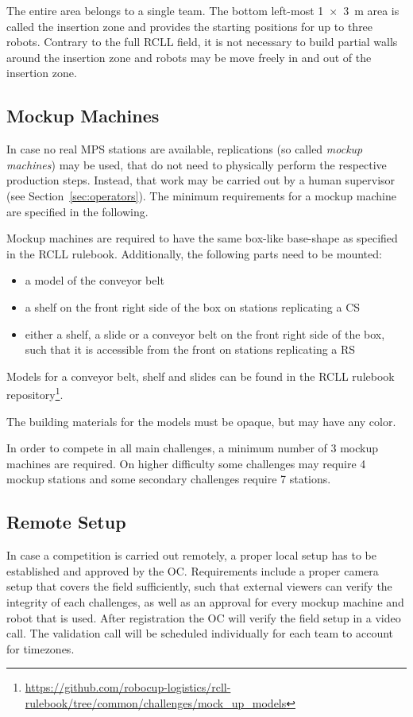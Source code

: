 \documentclass[12pt,twoside]{article}
\newcommand{\refsec}[1]{Section~\ref{#1}}
\begin{document}
The entire area belongs to a single team. The bottom left-most
\SI{1 x 3}{\metre} area is called the insertion zone and provides the starting
positions for up to three robots.
Contrary to the full RCLL field, it is not necessary to build partial walls
around the insertion zone and robots may be move freely in and out of the
insertion zone.
\subsection{Mockup Machines}\label{sec:machines}
In case no real \ac{MPS} stations are available, replications
(so called \emph{mockup machines}) may be used, that do not need to
physically perform the respective production steps. Instead, that work may
be carried out by a human supervisor (see \refsec{sec:operators}).
The minimum requirements for a mockup machine are specified in the following.

Mockup machines are required to have the same box-like base-shape as specified
in the RCLL rulebook.
Additionally, the following parts need to be mounted:
\begin{itemize}
	\item a model of the conveyor belt
	\item a shelf on the front right side of the box on stations replicating a \ac{CS}
	\item either a shelf, a slide or a conveyor belt on the front right side
of the box, such that it is accessible from the front on stations replicating a \ac{RS}
\end{itemize}
Models for a conveyor belt, shelf and slides can be found in the RCLL rulebook
repository\footnote{\url{https://github.com/robocup-logistics/rcll-rulebook/tree/common/challenges/mock_up_models}}.

The building materials for the models must be opaque, but may have any color.

In order to compete in all main challenges, a minimum number of 3 mockup
machines are required. On higher difficulty some challenges may require
4 mockup stations and some secondary challenges require 7 stations.

\subsection{Remote Setup}
In case a competition is carried out remotely, a proper local setup has to
be established and approved by the \ac{OC}.
Requirements include a proper camera setup that covers the field sufficiently,
such that external viewers can verify the integrity of each challenges,
as well as an approval for every mockup machine and robot that is used.
After registration the \ac{OC} will verify the field setup in a video call.
The validation call will be scheduled individually for each team
to account for timezones.
\end{document}
